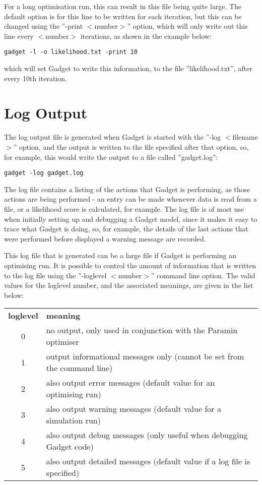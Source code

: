 \documentclass[10pt,twoside]{book}
\begin{document}
\bigskip
For a long optimisation run, this can result in this file being quite large.  The default option is for this line to be written for each iteration, but this can be changed using the ''-print $<$number$>$'' option, which will only write out this line every $<$number$>$ iterations, as shown in the example below:

{\small\begin{verbatim}
gadget -l -o likelihood.txt -print 10
\end{verbatim}}

which will set Gadget to write this information, to the file ''likelihood.txt'', after every 10th iteration.

\section{Log Output}\label{sec:logoutput}
The log output file is generated when Gadget is started with the ''-log $<$filename$>$'' option, and the output is written to the file specified after that option, so, for example, this would write the output to a file called ''gadget.log'':

{\small\begin{verbatim}
gadget -log gadget.log
\end{verbatim}}

The log file contains a listing of the actions that Gadget is performing, as those actions are being performed - an entry can be made whenever data is read from a file, or a likelihood score is calculated, for example.  The log file is of most use when initially setting up and debugging a Gadget model, since it makes it easy to trace what Gadget is doing, so, for example, the details of the last actions that were performed before displayed a warning message are recorded.

\bigskip
This log file that is generated can be a large file if Gadget is performing an optimising run.  It is possible to control the amount of information that is written to the log file using the ''-loglevel $<$number$>$'' command line option.  The valid values for the loglevel number, and the associated meanings, are given in the list below:

\bigskip
\begin{tabular}{cl}
{\bf loglevel} & {\bf meaning} \\
0 & no output, only used in conjunction with the Paramin optimiser \\
1 & output informational messages only (cannot be set from the command line) \\
2 & also output error messages (default value for an optimising run) \\
3 & also output warning messages (default value for a simulation run) \\
4 & also output debug messages (only useful when debugging Gadget code) \\
5 & also output detailed messages (default value if a log file is specified) \\
\end{tabular}
\end{document}
